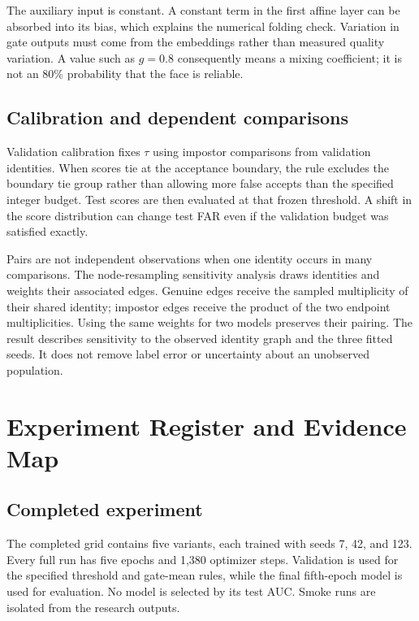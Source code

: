 \documentclass[12pt,a4paper,oneside]{report}
\begin{document}
The auxiliary input is constant. A constant term in the first affine layer can be absorbed into its bias, which explains the numerical folding check. Variation in gate outputs must come from the embeddings rather than measured quality variation. A value such as $g=0.8$ consequently means a mixing coefficient; it is not an 80\% probability that the face is reliable.

\section{Calibration and dependent comparisons}
Validation calibration fixes $\tau$ using impostor comparisons from validation identities. When scores tie at the acceptance boundary, the rule excludes the boundary tie group rather than allowing more false accepts than the specified integer budget. Test scores are then evaluated at that frozen threshold. A shift in the score distribution can change test FAR even if the validation budget was satisfied exactly.

Pairs are not independent observations when one identity occurs in many comparisons. The node-resampling sensitivity analysis draws identities and weights their associated edges. Genuine edges receive the sampled multiplicity of their shared identity; impostor edges receive the product of the two endpoint multiplicities. Using the same weights for two models preserves their pairing. The result describes sensitivity to the observed identity graph and the three fitted seeds. It does not remove label error or uncertainty about an unobserved population.

\chapter{Experiment Register and Evidence Map}
\section{Completed experiment}
The completed grid contains five variants, each trained with seeds 7, 42, and 123. Every full run has five epochs and 1,380 optimizer steps. Validation is used for the specified threshold and gate-mean rules, while the final fifth-epoch model is used for evaluation. No model is selected by its test AUC. Smoke runs are isolated from the research outputs.
\end{document}
